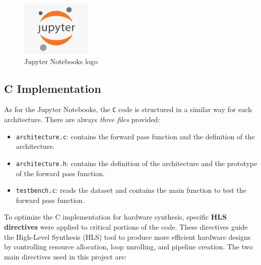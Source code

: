 \documentclass{article}
\begin{document}
\begin{figure}[H]
    \centering
    \includegraphics[width=0.3\textwidth]{./assets/jupyter-notebooks.png}
    \caption{Jupyter Notebooks logo}
    \label{fig:jupyter-notebooks}
\end{figure}



\subsection{C Implementation}
As for the Jupyter Notebooks, the \texttt{C} code is structured in a similar way for each architecture. There are always \textit{three files} provided:
\begin{itemize}
    \item \texttt{architecture.c}: contains the forward pass function and the definition of the architecture.
    \item \texttt{architecture.h}: contains the definition of the architecture and the prototype of the forward pass function.
    \item \texttt{testbench.c}: reads the dataset and contains the main function to test the forward pass function.
\end{itemize}

To optimize the C implementation for hardware synthesis, specific \textbf{HLS directives} were applied to critical portions of the code. These directives guide the High-Level Synthesis (HLS) tool to produce more efficient hardware designs by controlling resource allocation, loop unrolling, and pipeline creation. The two main directives used in this project are:
\end{document}
